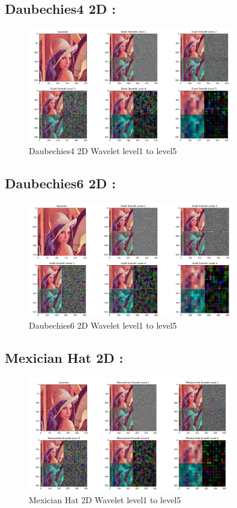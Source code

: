 \documentclass[12pt]{article}
\begin{document}
\subsection{Daubechies4 2D :}
\begin{figure}[h]
    \centering
    \includegraphics[width=0.8\textwidth]{img/Lena_Dub4.png}
    \caption{Daubechies4 2D Wavelet level1 to level5}
    \label{fig:mesh1}
\end{figure}
\subsection{Daubechies6 2D :}
\begin{figure}[h]
    \centering
    \includegraphics[width=0.8\textwidth]{img/Lena_Dub6.png}
    \caption{Daubechies6 2D Wavelet level1 to level5}
    \label{fig:mesh1}
\end{figure}
\newpage
\subsection{Mexician Hat 2D :}
\begin{figure}[h]
    \centering
    \includegraphics[width=0.8\textwidth]{img/Lena_Mex.png}
    \caption{Mexician Hat 2D Wavelet level1 to level5}
    \label{fig:mesh1}
\end{figure}
\end{document}
